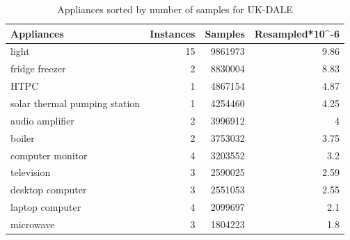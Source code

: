 \begin{table}[H]
    \centering
    \begin{tabular}{|l|r|r|r|}
    \hline
    \textbf{Appliances}           & \multicolumn{1}{l|}{\textbf{Instances}} & \multicolumn{1}{l|}{\textbf{Samples}} & \multicolumn{1}{l|}{\textbf{Resampled*10\textasciicircum{}-6}} \\ \hline
    light                         & 15                                      & 9861973                               & 9.86                                                         \\ \hline
    fridge freezer                & 2                                       & 8830004                               & 8.83                                                         \\ \hline
    HTPC                          & 1                                       & 4867154                               & 4.87                                                         \\ \hline
    solar thermal pumping station & 1                                       & 4254460                               & 4.25                                                         \\ \hline
    audio amplifier               & 2                                       & 3996912                               & 4                                                            \\ \hline
    boiler                        & 2                                       & 3753032                               & 3.75                                                         \\ \hline
    computer monitor              & 4                                       & 3203552                               & 3.2                                                          \\ \hline
    television                    & 3                                       & 2590025                               & 2.59                                                         \\ \hline
    desktop computer              & 3                                       & 2551053                               & 2.55                                                         \\ \hline
    laptop computer               & 4                                       & 2099697                               & 2.1                                                          \\ \hline
    microwave                     & 3                                       & 1804223                               & 1.8                                                          \\ \hline
    \end{tabular}
    \caption{Appliances sorted by number of samples for UK-DALE}
    \label{tab:ukdale_table}
\end{table}


